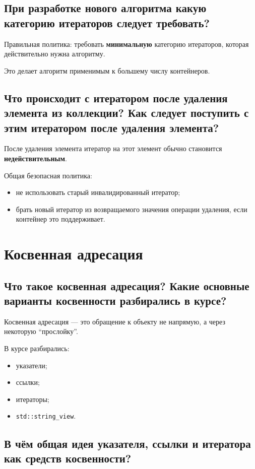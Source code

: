 \subsection{При разработке нового алгоритма какую категорию итераторов следует требовать?}

Правильная политика: требовать \textbf{минимальную} категорию итераторов, которая действительно нужна алгоритму.

Это делает алгоритм применимым к большему числу контейнеров.


\subsection{Что происходит с итератором после удаления элемента из коллекции? Как следует поступить с этим итератором после удаления элемента?}

После удаления элемента итератор на этот элемент обычно становится \textbf{недействительным}.

Общая безопасная политика:
\begin{itemize}
    \item не использовать старый инвалидированный итератор;
    \item брать новый итератор из возвращаемого значения операции удаления, если контейнер это поддерживает.
\end{itemize}



\section{Косвенная адресация}

\subsection{Что такое косвенная адресация? Какие основные варианты косвенности разбирались в курсе?}

Косвенная адресация --- это обращение к объекту не напрямую, а через некоторую ``прослойку''.

В курсе разбирались:
\begin{itemize}
    \item указатели;
    \item ссылки;
    \item итераторы;
    \item \texttt{std::string\_view}.
\end{itemize}


\subsection{В чём общая идея указателя, ссылки и итератора как средств косвенности?}


